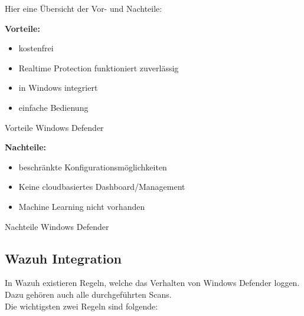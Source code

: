 \newpage

Hier eine Übersicht der Vor- und Nachteile:\\

\begin{minipage}{\linewidth}
    \begin{multicols}{2}
        \begin{table}[H]
            \begin{center}
                \textbf{Vorteile:}
                \begin{itemize}
                    \item kostenfrei
                    \item Realtime Protection funktioniert zuverlässig
                    \item in Windows integriert
                    \item einfache Bedienung
                \end{itemize}
            \end{center}
            \caption{Vorteile Windows Defender}
        \end{table}
        \begin{table}[H]
            \begin{center}
                \textbf{Nachteile:}
                \begin{itemize}
                    \item beschränkte Konfigurationsmöglichkeiten
                    \item Keine cloudbasiertes Dashboard/Management
                    \item Machine Learning nicht vorhanden
                \end{itemize}
            \end{center}
            \caption{Nachteile Windows Defender}
        \end{table}
    \end{multicols}
\end{minipage}




\subsection{Wazuh Integration}
In Wazuh existieren Regeln, welche das Verhalten von Windows Defender loggen.
Dazu gehören auch alle durchgeführten Scans.\\

Die wichtigsten zwei Regeln sind folgende:
